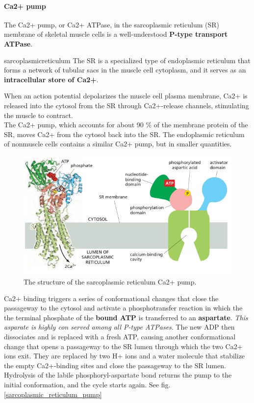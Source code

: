 \documentclass[../main.tex]{subfiles}
\begin{document}
\paragraph{Ca2+ pump}
The Ca2+ pump, or Ca2+ ATPase, in the sarcoplasmic reticulum (SR) membrane of skeletal muscle cells is a well-understood \textbf{P-type transport ATPase}.
\begin{RemarkWithTitel}{\gls{sarcoplasmicreticulum}}
	The SR is a specialized type of endoplasmic reticulum that forms a network of tubular sacs in the muscle cell cytoplasm, and it serves as an \textbf{intracellular store of Ca2+}. 
\end{RemarkWithTitel}
When an action potential depolarizes the muscle cell plasma membrane, Ca2+ is released into the cytosol from the SR through Ca2+-release channels, stimulating the muscle to contract. \\
The Ca2+ pump, which accounts for about 90 \% of the membrane protein of the SR, moves Ca2+ from the cytosol back into the SR. The endoplasmic reticulum of nonmuscle cells contains a similar Ca2+ pump, but in smaller quantities.
\begin{figure}[H]
	\centering
	\includegraphics[width = 0.6 \textwidth]{16}
	\caption{The structure of the sarcoplasmic reticulum Ca2+ pump.}
\end{figure}
Ca2+ binding triggers a series of conformational changes that close the passageway to the cytosol and activate a phosphotransfer reaction in which the the terminal phosphate of the \textbf{bound ATP} is transferred to an \textbf{aspartate}. \textit{This asparate is highly con served among all P-type ATPases}. The new ADP then dissociates and is replaced with a fresh ATP, causing another conformational change that opens a passageway to the SR lumen through which the two Ca2+ ions exit. They are replaced by two H+ ions and a water molecule that stabilize the empty Ca2+-binding sites and close the passageway to the SR lumen. Hydrolysis of the labile phosphoryl-aspartate bond returns the pump to the initial conformation, and the cycle starts again. See fig. \ref{sarcoplasmic_reticulum_pump}
\end{document}
